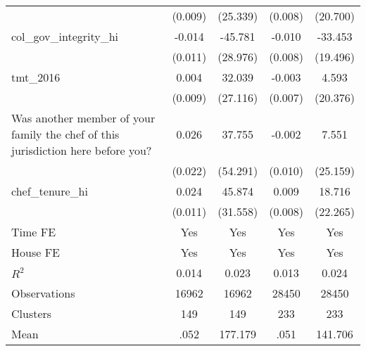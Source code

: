 {\begin{tabular}{l*{4}{c}}
                &  (0.009)         & (25.339)         &  (0.008)         & (20.700)         \\
col\_gov\_integrity\_hi&   -0.014         &  -45.781         &   -0.010         &  -33.453\sym{*}  \\
                &  (0.011)         & (28.976)         &  (0.008)         & (19.496)         \\
tmt\_2016        &    0.004         &   32.039         &   -0.003         &    4.593         \\
                &  (0.009)         & (27.116)         &  (0.007)         & (20.376)         \\
Was another member of your family the chef of this jurisdiction here before you?&    0.026         &   37.755         &   -0.002         &    7.551         \\
                &  (0.022)         & (54.291)         &  (0.010)         & (25.159)         \\
chef\_tenure\_hi  &    0.024\sym{**} &   45.874         &    0.009         &   18.716         \\
                &  (0.011)         & (31.558)         &  (0.008)         & (22.265)         \\
Time FE         &      Yes         &      Yes         &      Yes         &      Yes         \\
House FE        &      Yes         &      Yes         &      Yes         &      Yes         \\
\hline
\(R^{2}\)       &    0.014         &    0.023         &    0.013         &    0.024         \\
Observations    &    16962         &    16962         &    28450         &    28450         \\
Clusters        &      149         &      149         &      233         &      233         \\
Mean            &     .052         &  177.179         &     .051         &  141.706         \\
\hline\hline
\end{tabular}
}
